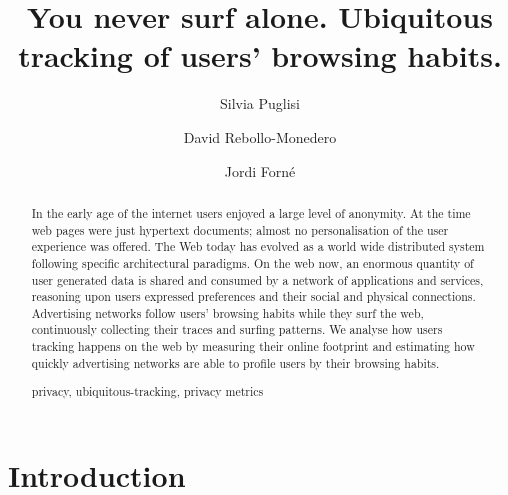 \documentclass[runningheads,a4paper]{llncs}
\newcommand{\keywords}[1]{\par\addvspace\baselineskip
\noindent\keywordname\enspace\ignorespaces#1}
\begin{document}
\mainmatter  

\title{You never surf alone. Ubiquitous tracking of users' browsing habits.}


\author{Silvia Puglisi\and David Rebollo-Monedero\and Jordi Forn\'e}





\maketitle


\begin{abstract}

In the early age of the internet users enjoyed a large level of anonymity. At the time web pages were just hypertext documents; almost no personalisation of the user experience was offered. The Web today has evolved as a world wide distributed system following specific architectural paradigms. On the web now, an enormous quantity of user generated data is shared and consumed by a network of applications and services, reasoning upon users expressed preferences and their social and physical connections. Advertising networks follow users' browsing habits while they surf the web, continuously collecting their traces and surfing patterns. We analyse how users tracking happens on the web by measuring their online footprint and estimating how quickly advertising networks are able to profile users by their browsing habits.

\keywords{privacy, ubiquitous-tracking, privacy metrics}
\end{abstract}

\section{Introduction}
\end{document}

